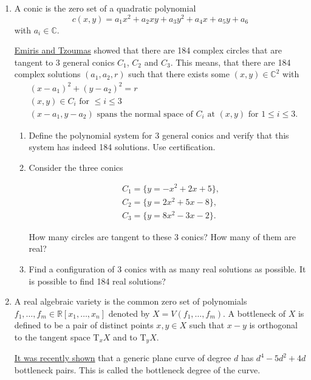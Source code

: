 \documentclass[11pt,reqno]{amsart}
\theoremstyle{definition}
\theoremstyle{remark}
\numberwithin{equation}{section}
\begin{document}
\begin{enumerate}
\item A conic is the zero set of a quadratic polynomial
$$
c(x,y) = a_1 x^2 + a_2 x y + a_3 y^2 + a_4 x + a_5 y + a_6
$$
with $a_i \in \mathbb{C}$.

\href{http://www.win.tue.nl/EWCG2005/Proceedings/38.pdf}{Emiris and Tzoumas} showed that there are 184 complex circles that are tangent to 3 general conics $C_1$, $C_2$ and $C_3$. This means, that there are 184 complex solutions $(a_1,a_2,r)$ such that there exists some $(x,y)\in\mathbb{C}^2$ with
\begin{align*}
&(x-a_1)^2 + (y-a_2)^2 = r\\
&(x,y)\in C_i \text{ for } \leq i\leq 3\\
&(x-a_1, y-a_2) \text{ spans the normal space of $C_i$ at $(x,y)$ for $1\leq i\leq 3$.}
\end{align*}

\begin{enumerate}
\item Define the polynomial system for 3 general conics and verify that this system has indeed 184 solutions. Use certification.

\item
Consider the three conics

\begin{align*}
&C_1 = \{y=-x^2+2x+5\},\\
&C_2 = \{y = 2x^2+5x-8\},\\
&C_3 = \{y = 8x^2-3x-2\}.
\end{align*}

How many circles are tangent to these 3 conics? How many of them are real?

\item Find a configuration of 3 conics with as many real solutions as possible. It is possible to find 184 real solutions?

\end{enumerate}

\item A real algebraic variety is the common zero set of polynomials $f_1, \ldots, f_m \in \mathbb{R}[x_1,\ldots,x_n]$ denoted by $X=V(f_1,\ldots,f_m)$. A bottleneck of $X$ is defined to be a pair of distinct points $x, y \in X$ such that $x-y$ is orthogonal to the tangent space $\mathrm{T}_x X$ and to $\mathrm{T}_y X$.

\href{https://arxiv.org/abs/1904.04502}{It was recently shown} that a generic plane curve of degree $d$ has $d^4-5d^2 +4d$ bottleneck pairs. This is called the {bottleneck degree} of the curve.



\end{enumerate}
\end{document}

